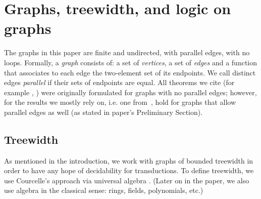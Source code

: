 \section{Graphs, treewidth, and logic on graphs}
The graphs in this paper are finite and undirected, with parallel edges, with no loops. Formally, a \emph{graph} consists of: a set of \emph{vertices}, a set of \emph{edges} and a function that associates to each edge the two-element set of its endpoints. We call distinct edges \emph{parallel} if their sets of endpoints are equal. All theorems we cite (for example \cite[Proposition 4.1]{courcelleEtAlAlgebraicTheoryOfGraphReduction93}, \cite[Theorem 2]{groheDellRattan2018}) were originally formulated for graphs with no parallel edges; however, for the results we mostly rely on, i.e. one from~\cite{groheDellRattan2018}, hold for graphs that allow parallel edges as well (as stated in paper's Preliminary Section).

\subsection{Treewidth} 
\label{sec:treewidth-definition}
As mentioned in the introduction, we work with graphs of bounded treewidth in order to have any hope of decidability for \mso transductions. 
To define treewidth, we use Courcelle's  approach via universal algebra \cite{courcelleEtAlAlgebraicTheoryOfGraphReduction93}. (Later on in the paper, we also use algebra in the classical sense: rings, fields, polynomials, etc.)


